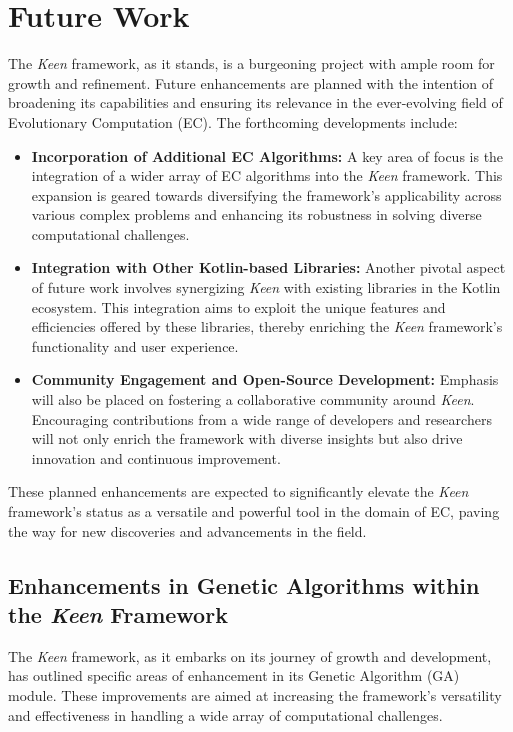 \section{Future Work}
\label{sec:future_work}
    The \textit{Keen} framework, as it stands, is a burgeoning project with ample room for growth and refinement. Future 
    enhancements are planned with the intention of broadening its capabilities and ensuring its relevance in the 
    ever-evolving field of Evolutionary Computation (EC). The forthcoming developments include:

    \begin{itemize}
        \item \textbf{Incorporation of Additional EC Algorithms:} A key area of focus is the integration of a wider 
            array of EC algorithms into the \textit{Keen} framework. This expansion is geared towards diversifying the 
            framework's applicability across various complex problems and enhancing its robustness in solving diverse 
            computational challenges.
        \item \textbf{Integration with Other Kotlin-based Libraries:} Another pivotal aspect of future work involves 
            synergizing \textit{Keen} with existing libraries in the Kotlin ecosystem. This integration aims to exploit 
            the unique features and efficiencies offered by these libraries, thereby enriching the \textit{Keen} 
            framework's functionality and user experience.
        \item \textbf{Community Engagement and Open-Source Development:} Emphasis will also be placed on fostering a 
            collaborative community around \textit{Keen}. Encouraging contributions from a wide range of developers and 
            researchers will not only enrich the framework with diverse insights but also drive innovation and 
            continuous improvement.
    \end{itemize}

    These planned enhancements are expected to significantly elevate the \textit{Keen} framework's status as a versatile 
    and powerful tool in the domain of EC, paving the way for new discoveries and advancements in the field.

    \subsection{Enhancements in Genetic Algorithms within the \textit{Keen} Framework}
    \label{sec:future:ga}
        The \textit{Keen} framework, as it embarks on its journey of growth and development, has outlined specific areas 
        of enhancement in its Genetic Algorithm (GA) module. These improvements are aimed at increasing the framework's 
        versatility and effectiveness in handling a wide array of computational challenges.


